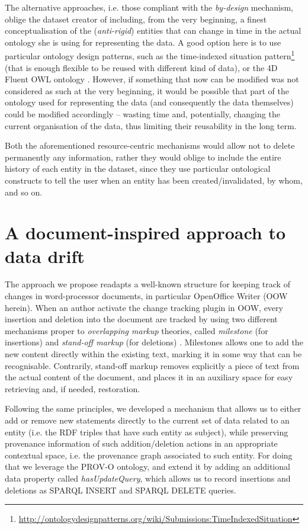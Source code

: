\documentclass[runningheads,a4paper]{llncs}
\begin{document}
The alternative approaches, i.e. those compliant with the {\em by-design} mechanism, oblige the dataset creator of including, from the very beginning, a finest conceptualisation of the ({\em anti-rigid}) entities that can change in time in the actual ontology she is using for representing the data. A good option here is to use particular ontology design patterns, such as the time-indexed situation pattern\footnote{\url{http://ontologydesignpatterns.org/wiki/Submissions:TimeIndexedSituation}} (that is enough flexible to be reused with different kind of data), or the 4D Fluent OWL ontology  \cite{__RefNumPara__17813_1591320820}. However, if something that now can be modified was not considered as such at the very beginning, it would be possible that part of the ontology used for representing the data (and consequently the data themselves) could be modified accordingly -- wasting time and, potentially, changing the current organisation of the data, thus limiting their reusability in the long term.

Both the aforementioned resource-centric mechanisms would allow not to delete permanently any information, rather they would oblige to include the entire history of each entity in the dataset, since they use particular ontological constructs to tell the user when an entity has been created/invalidated, by whom, and so on.

\section{A document-inspired approach to data drift}\label{__RefHeading__16812_1591320820}

The approach we propose readapts a well-known structure for keeping track of changes in word-processor documents, in particular OpenOffice Writer (OOW herein). When an author activate the change tracking plugin in OOW, every insertion and deletion into the document are tracked by using two different mechanisms proper to {\em overlapping markup} theories, called {\em milestone} (for insertions) and {\em stand-off markup} (for deletions)  \cite{__RefNumPara__17979_1591320820}. Milestones allows one to add the new content directly within the existing text, marking it in some way that can be recognisable. Contrarily, stand-off markup removes explicitly a piece of text from the actual content of the document, and places it in an auxiliary space for easy retrieving and, if needed, restoration.

Following the same principles, we developed a mechanism that allows us to either add or remove new statements directly to the current set of data related to an entity (i.e. the RDF triples that have such entity as subject), while preserving provenance information of such addition/deletion actions in an appropriate contextual space, i.e. the provenance graph associated to such entity. For doing that we leverage the PROV-O  \cite{__RefNumPara__17349_1591320820} ontology, and extend it by adding an additional data property called {\em hasUpdateQuery}, which allows us to record insertions and deletions as SPARQL INSERT and SPARQL DELETE queries.
\end{document}
